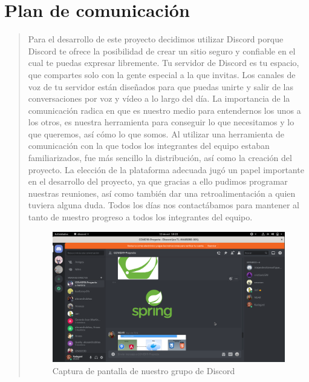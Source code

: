 \documentclass[14pt,a4paper]{article}
\begin{document}
\section{Plan de comunicación}
\vspace{0.5 cm}
\begin{verse}
Para el desarrollo de este proyecto decidimos utilizar Discord porque Discord te ofrece la posibilidad de crear un sitio seguro y confiable en el cual te puedas expresar libremente. Tu servidor de Discord es tu espacio, que compartes solo con la gente especial a la que invitas. Los canales de voz de tu servidor están diseñados para que puedas unirte y salir de las conversaciones por voz y vídeo a lo largo del día. La importancia de la comunicación radica en que es nuestro medio para entendernos los unos a los otros, es nuestra herramienta para conseguir lo que necesitamos y lo que queremos, así cómo lo que somos. 
Al utilizar una herramienta de comunicación con la que todos los integrantes del equipo estaban familiarizados, fue más sencillo la distribución, así como la creación del proyecto. La elección de la plataforma adecuada jugó un papel importante en el desarrollo del proyecto, ya que gracias a ello pudimos programar nuestras reuniones, así como también dar una retroalimentación a quien tuviera alguna duda. Todos los días nos contactábamos para mantener al tanto de nuestro progreso a todos los integrantes del equipo.
\begin{figure}[htb]


\includegraphics[scale=0.3]{Captura de pantalla de 2020-10-12 18-22-20.png} 

\caption{Captura de pantalla de nuestro grupo de Discord}
\label{fig:captura}
\end{figure}

\end{verse}
 
\end{document}
